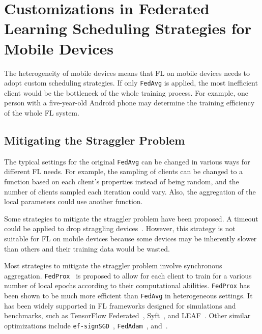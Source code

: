 \documentclass[conference]{IEEEtran}
\begin{document}
\section{Customizations in Federated Learning Scheduling Strategies for
    Mobile Devices
}

The heterogeneity of mobile devices means that FL on mobile devices needs to
adopt custom scheduling strategies.
If only \verb|FedAvg| is applied,
the most inefficient client would be the bottleneck of
the whole training process.
For example, one person with a five-year-old Android phone may determine
the training efficiency of the whole FL system.

\subsection{Mitigating the Straggler Problem}

The typical settings for the original \verb|FedAvg| can be changed in
various ways for different FL needs.
For example,
the sampling of clients can be changed to a function based on
each client's properties instead of being random,
and the number of clients sampled each iteration could vary.
Also, the aggregation of the local parameters could use another function.

Some strategies to mitigate the straggler problem have been proposed.
A timeout could be applied to drop
straggling devices~\cite{bonawitz2019towards}.
However, this strategy is not suitable for FL on mobile devices because
some devices may be inherently slower than others and
their training data would be wasted.

Most strategies to mitigate the straggler problem involve
synchronous aggregation.
\verb|FedProx|~\cite{li2020federated} is proposed to
allow for each client to train for a various number of local epochs according to
their computational abilities.
\verb|FedProx| has been shown to be much more efficient than
\verb|FedAvg| in heterogeneous settings.
It has been widely supported in FL frameworks designed for simulations and
benchmarks, such as
TensorFlow Federated~\cite{tff},
Syft~\cite{ryffel2018generic,Ziller2021,hall2021syft}, and
LEAF~\cite{caldas2018leaf}.
Other similar optimizations include
\verb|ef-signSGD|~\cite{karimireddy2019error},
\verb|FedAdam|~\cite{reddi2020adaptive},
and~\cite{luo2021cost}.

\newcommand{\FedML}{FedML~\cite{he2020fedml}}
\newcommand{\Florida}{Project Florida~\cite{madrigal2023project}}
\end{document}
